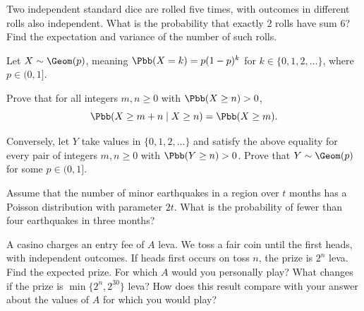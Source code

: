 \begin{problembook}
Two independent standard dice are rolled five times, with outcomes in different
rolls also independent. What is the probability that exactly 2 rolls have sum 6?
Find the expectation and variance of the number of such rolls.
\end{problembook}
\begin{problempencil}
Let $X\sim\Geom(p)$, meaning $\Pbb(X=k)=p(1-p)^k$ for $k\in\{0,1,2,\dots\}$,
where $p\in(0,1]$.
\begin{enumeratea}
  \item Prove that for all integers $m,n\ge0$ with $\Pbb(X\ge n)>0$,
  \[ \Pbb(X\ge m+n\mid X\ge n)=\Pbb(X\ge m). \]
  \item Conversely, let $Y$ take values in $\{0,1,2,\dots\}$ and satisfy the above
  equality for every pair of integers $m,n\ge0$ with $\Pbb(Y\ge n)>0$.
  Prove that $Y\sim\Geom(p)$ for some $p\in(0,1]$.
\end{enumeratea}
\end{problempencil}
\begin{problembook}
Assume that the number of minor earthquakes in a region over $t$ months has a
Poisson distribution with parameter $2t$. What is the probability of fewer than
four earthquakes in three months?
\end{problembook}
\begin{probleminteresting}
A casino charges an entry fee of $A$ leva. We toss a fair coin until the first
heads, with independent outcomes. If heads first occurs on toss $n$, the prize
is $2^n$ leva. Find the expected prize. For which $A$ would you personally play?
What changes if the prize is $\min\{2^n,2^{30}\}$ leva? How does this result
compare with your answer about the values of $A$ for which you would play?
\end{probleminteresting}
